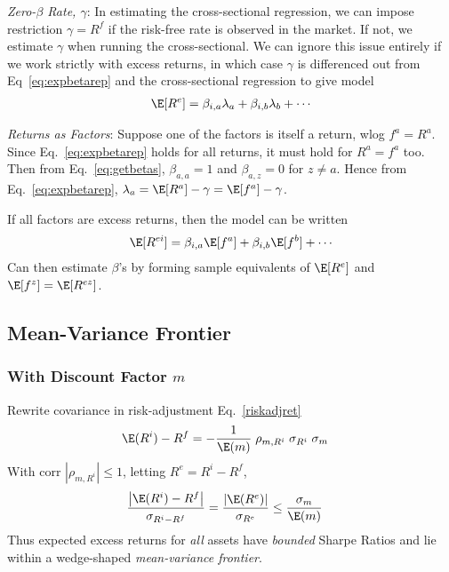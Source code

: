 \documentclass[12pt]{article}
\theoremstyle{plain}
\theoremstyle{definition}
\theoremstyle{remark}
\begin{document}
\begin{multicols*}{2}
\emph{Zero-$\beta$ Rate, $\gamma$}:
In estimating the cross-sectional regression, we can impose restriction
$\gamma=R^f$ if the risk-free rate is observed in the market.
If not, we estimate $\gamma$ when running the cross-sectional.
We can ignore this issue entirely if we work strictly with excess
returns, in which case $\gamma$ is differenced out from
Eq~\ref{eq:expbetarep} and the cross-sectional regression to give model
\begin{align}
  \E[R^e]
  = \beta_{i,a}\lambda_a + \beta_{i,b} \lambda_b + \cdots
\end{align}

\emph{Returns as Factors}:
Suppose one of the factors is itself a return, wlog $f^a=R^a$.
Since Eq.~\ref{eq:expbetarep} holds for all returns, it must hold for
$R^a=f^a$ too. Then from Eq.~\ref{eq:getbetas}, $\beta_{a,a}=1$ and
$\beta_{a,z}=0$ for $z\neq a$.  Hence from Eq.~\ref{eq:expbetarep},
$\lambda_a=\E[R^a]-\gamma=\E[f^a]-\gamma$.

If all factors are excess returns, then the model can be written
\begin{align}
  \E[R^{ei}]
  = \beta_{i,a}\E[f^a] + \beta_{i,b} \E[f^b] + \cdots
\end{align}
Can then estimate $\beta$'s by forming sample equivalents of $\E[R^e]$
and $\E[f^z]=\E[R^{ez}]$.


\clearpage
\subsection{Mean-Variance Frontier}

\subsubsection{With Discount Factor $m$}

Rewrite covariance in risk-adjustment Eq.~\ref{riskadjret}
\begin{align*}
  \E(R^i) - R^f
  &= -\frac{1}{\E(m)} \; \rho_{m,R^i} \; \sigma_{R^i} \; \sigma_m
\end{align*}
With corr $|\rho_{m,R^i}|\leq 1$,
letting $R^e=R^i-R^f$,
\begin{align*}
  \frac{\left\lvert\E(R^i) - R^f\right\rvert}{\sigma_{R^i-R^f}}
  =
  \frac{\left\lvert\E(R^e)\right\rvert}{\sigma_{R^e}}
  &\leq \frac{\sigma_m}{\E(m)}
\end{align*}
Thus expected excess returns for \emph{all} assets have \emph{bounded}
Sharpe Ratios and lie within a wedge-shaped
\emph{mean-variance frontier}.


\end{multicols*}
\end{document}
